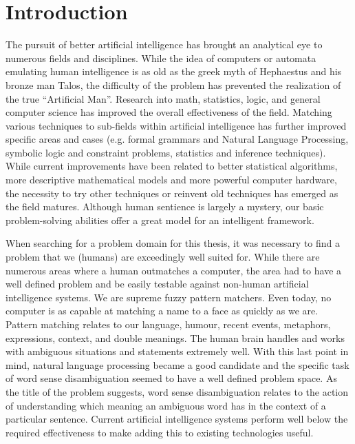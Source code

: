 \chapter{Introduction}

The pursuit of better artificial intelligence has brought an analytical eye to
numerous fields and disciplines.  While the idea of computers or automata
emulating human intelligence is as old as the greek myth of Hephaestus and his
bronze man Talos\cite{TALOS}, the difficulty of the problem has prevented the 
realization of the true ``Artificial Man''.  Research into math, statistics, logic, and general
computer science has improved the overall effectiveness of the field. Matching
various techniques to sub-fields within artificial intelligence has further
improved specific areas and cases (e.g. formal grammars and Natural Language
Processing, symbolic logic and constraint problems, statistics and inference
techniques). While current improvements have been related to better statistical
algorithms, more descriptive mathematical models and more powerful computer
hardware, the necessity to try other techniques or reinvent old techniques has
emerged as the field matures.  Although human sentience is largely a mystery, our basic problem-solving abilities offer a great model for an intelligent framework.

When searching for a problem domain for this thesis, it was necessary to find a
problem that we (humans) are exceedingly well suited for.  While there are
numerous areas where a human outmatches a computer, the area had to have a well
defined problem and be easily testable against non-human artificial intelligence
systems.  We are supreme fuzzy pattern matchers.  Even today, no computer is as
capable at matching a name to a face as quickly as we are.  Pattern matching relates
to our language, humour, recent events, metaphors, expressions, context, and
double meanings. The human brain handles and works with ambiguous situations and
statements extremely well.  With this last point in mind, natural
language processing became a good candidate and the specific task of word sense disambiguation seemed
to have a well defined problem space.  As the title of the problem suggests,
word sense disambiguation relates to the action of understanding which meaning
an ambiguous word has in the context of a particular sentence. Current
artificial intelligence systems perform well below the required effectiveness to
make adding this to existing technologies useful.

